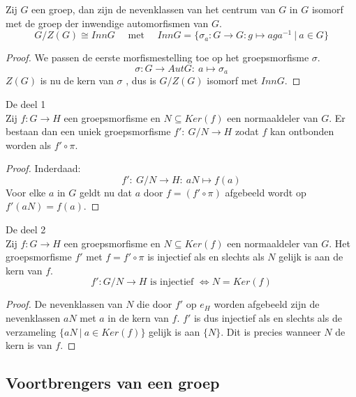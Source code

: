 \documentclass[main.tex]{subfiles}
\begin{document}
\begin{pr}
  Zij $G$ een groep, dan zijn de nevenklassen van het centrum van $G$ in $G$ isomorf met de groep der inwendige automorfismen van $G$.
  \[ G/Z(G) \cong Inn G \quad\text{ met }\quad Inn G = \{ \sigma_{a}: G \rightarrow G: g \mapsto aga^{-1} \ |\ a\in G \} \]

  \begin{proof}
    We passen de eerste morfismestelling toe op het groepsmorfisme $\sigma$.
    \[ \sigma: G \rightarrow Aut G:\ a \mapsto \sigma_{a} \]
    $Z(G)$ is nu de kern van $\sigma$ \waarom , dus is $G/Z(G)$ isomorf met $Inn G$.
  \end{proof}
\end{pr}

\begin{st}
  De  deel 1\\
  Zij $f: G\rightarrow H$ een groepsmorfisme en $N\subseteq Ker(f)$ een normaaldeler van $G$.
  Er bestaan dan een uniek groepsmorfisme $f':\ G/N \rightarrow H$ zodat $f$ kan ontbonden worden als $f'\circ \pi$.

  \begin{proof}
    Inderdaad:
    \[ f':\ G/N \rightarrow H:\ aN \mapsto f(a) \]
    Voor elke $a$ in $G$ geldt nu dat $a$ door $f= (f' \circ \pi)$ afgebeeld wordt op $f'(aN) = f(a)$.
  \end{proof}
\end{st}

\begin{st}
  De  deel 2\\
  Zij $f: G\rightarrow H$ een groepsmorfisme en $N\subseteq Ker(f)$ een normaaldeler van $G$.
  Het groepsmorfisme $f'$ met $f = f'\circ \pi$ is injectief als en slechts als $N$ gelijk is aan de kern van $f$.
  \[ f':G/N \rightarrow H \text{ is injectief } \Leftrightarrow N = Ker(f) \]

  \begin{proof}
    De nevenklassen van $N$ die door $f'$ op $e_{H}$ worden afgebeeld zijn de nevenklassen $aN$ met $a$ in de kern van $f$.
    $f'$ is dus injectief als en slechts als de verzameling $\{ aN \ |\ a \in Ker(f) \}$ gelijk is aan $\{ N \}$.
    Dit is precies wanneer $N$ de kern is van $f$.
  \end{proof}
\end{st}

\subsection{Voortbrengers van een groep}
\end{document}
